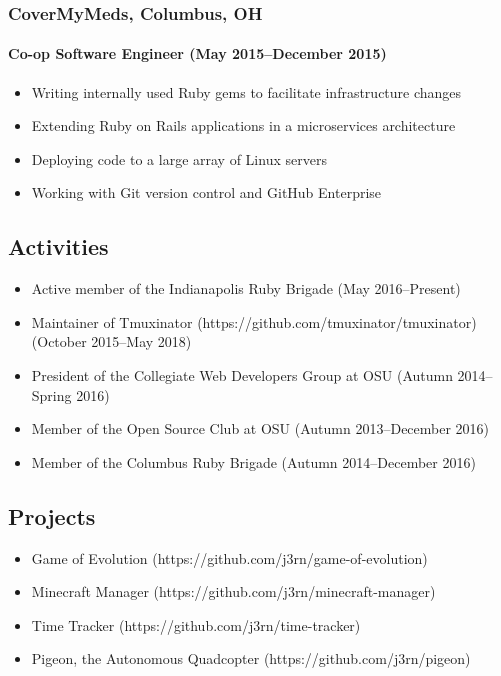 \documentclass[]{article}
\begin{document}
\subsubsection*{CoverMyMeds, Columbus, OH}
\paragraph{Co-op Software Engineer (May 2015--December 2015)}
\begin{itemize}
\item Writing internally used Ruby gems to facilitate infrastructure changes
\item Extending Ruby on Rails applications in a microservices architecture
\item Deploying code to a large array of Linux servers
\item Working with Git version control and GitHub Enterprise
\end{itemize}

\subsection*{Activities}
\begin{itemize}
\item Active member of the Indianapolis Ruby Brigade (May 2016--Present)
\item Maintainer of Tmuxinator (https://github.com/tmuxinator/tmuxinator) (October 2015--May 2018)
\item President of the Collegiate Web Developers Group at OSU (Autumn 2014--Spring 2016)
\item Member of the Open Source Club at OSU (Autumn 2013--December 2016)
\item Member of the Columbus Ruby Brigade (Autumn 2014--December 2016)
\end{itemize}

\subsection*{Projects}
\begin{itemize}
\item Game of Evolution (https://github.com/j3rn/game-of-evolution)
\item Minecraft Manager (https://github.com/j3rn/minecraft-manager)
\item Time Tracker (https://github.com/j3rn/time-tracker)
\item Pigeon, the Autonomous Quadcopter (https://github.com/j3rn/pigeon)
\end{itemize}
\end{document}
